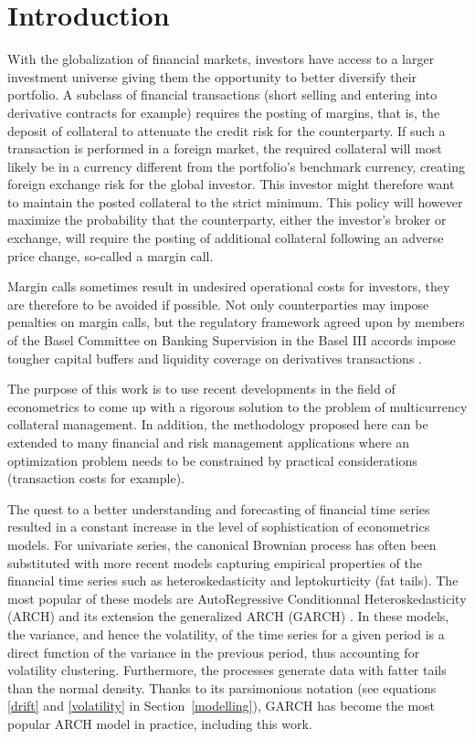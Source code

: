 \section{Introduction}
With the globalization of financial markets, investors have access to a larger
investment universe giving them the opportunity to better diversify their
portfolio. A subclass of financial transactions (short selling and entering
into derivative contracts for example) requires the posting of margins, that is,
the deposit of collateral to attenuate the credit risk for the counterparty. If
such a transaction is performed in a foreign market, the required collateral
will most likely be in a currency different from the portfolio's benchmark
currency, creating foreign exchange risk for the global investor. This investor
might therefore want to maintain the posted collateral to the strict minimum.
This policy will however maximize the probability that the counterparty, either
the investor's broker or exchange, will require the posting of additional
collateral following an adverse price change, so-called a margin call.

Margin calls sometimes result in undesired operational costs for investors, they
are therefore to be avoided if possible. Not only counterparties may impose
penalties on margin calls, but the regulatory framework agreed upon by members
of the Basel Committee on Banking Supervision in the Basel III accords impose
tougher capital buffers and liquidity coverage on derivatives transactions
\citep{basel1,basel2}.

The purpose of this work is to use recent developments in the field of
econometrics to come up with a  rigorous solution to the problem of
multicurrency collateral management. In addition, the methodology proposed here
can be extended to many financial and risk management applications where an
optimization problem needs to be constrained by practical considerations
(transaction costs for example). 

The quest to a better understanding and forecasting of financial time series
resulted in a constant increase in the level of sophistication of econometrics
models. For univariate series, the canonical Brownian process
\citep{brown1828, bachelier1900, merton69} has often been substituted with more
recent models capturing empirical properties of the financial time series such
as heteroskedasticity and leptokurticity (fat tails). The most popular of these
models are AutoRegressive Conditionnal  Heteroskedasticity (ARCH) \citep{engle82}
and its extension the generalized ARCH (GARCH) \citep{bollerslev86}. In these
models, the variance, and hence the volatility, of the time series for a given
period is a direct function of the variance in the previous period, thus
accounting for volatility clustering. Furthermore, the processes generate data
with fatter tails than the normal density. Thanks to its parsimonious notation
(see equations \eqref{drift} and \eqref{volatility} in Section~\ref{modelling}),
GARCH has become the most popular ARCH model in practice, including this work.

